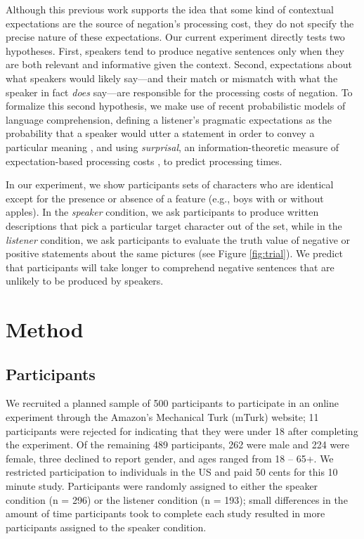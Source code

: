 \documentclass[man, noapacite]{apa2}
\begin{document}
Although this previous work supports the idea that some kind of contextual expectations are the source of negation's processing cost, they do not specify the precise nature of these expectations.  Our current experiment directly tests two hypotheses.  First, speakers tend to produce negative sentences only when they are both relevant and informative given the context.  Second, expectations about what speakers would likely say---and their match or mismatch with what the speaker in fact \emph{does} say---are responsible for the processing costs of negation. To formalize this second hypothesis, we make use of recent probabilistic models of language comprehension, defining a listener's pragmatic expectations as the probability that a speaker would utter a statement in order to convey a particular meaning \cite{frank2012}, and using \emph{surprisal}, an information-theoretic measure of expectation-based processing costs \cite{levy2008}, to predict processing times.  

In our experiment, we show participants sets of characters who are identical except for the presence or absence of a feature (e.g., boys with or without apples). In the \emph{speaker} condition, we ask participants to produce written descriptions that pick a particular target character out of the set, while in the \emph{listener} condition, we ask participants to evaluate the truth value of negative or positive statements about the same pictures (see Figure \ref{fig:trial}). We predict that participants will take longer to comprehend negative sentences that are unlikely to be produced by speakers.


\section{Method}

\subsection{Participants} 

We recruited a planned sample of 500 participants to participate in an online experiment through the Amazon's Mechanical Turk (mTurk) website; 11 participants were rejected for indicating that they were under 18 after completing the experiment.  Of the remaining 489 participants, 262 were male and 224 were female, three declined to report gender, and ages ranged from 18 -- 65+.  We restricted participation to individuals in the US and paid 50 cents for this 10 minute study.  Participants were randomly assigned to either the speaker condition (n = 296) or the listener condition (n = 193); small differences in the amount of time participants took to complete each study resulted in more participants assigned to the speaker condition.
\end{document}
